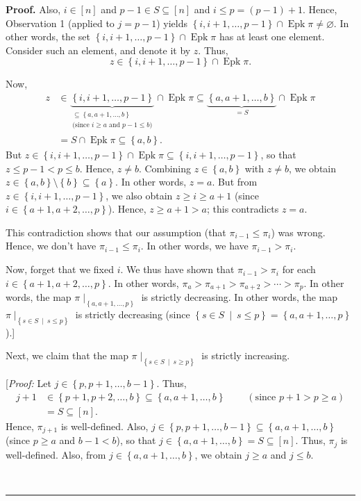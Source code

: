 \documentclass[numbers=enddot,12pt,final,onecolumn,notitlepage]{scrartcl}%
\theoremstyle{definition}
\newenvironment{proof}[1][Proof]{\noindent\textbf{#1.} }{\ \rule{0.5em}{0.5em}}
\newenvironment{verlong}{}{}
\begin{document}
\begin{verlong}
\begin{proof}
Also, $i\in\left[  n\right]  $ and $p-1\in S\subseteq\left[  n\right]  $ and
$i\leq p=\left(  p-1\right)  +1$. Hence, Observation 1 (applied to $j=p-1$)
yields $\left\{  i,i+1,\ldots,p-1\right\}  \cap\operatorname{Epk}\pi
\neq\varnothing$. In other words, the set $\left\{  i,i+1,\ldots,p-1\right\}
\cap\operatorname{Epk}\pi$ has at least one element. Consider such an
element, and denote it by $z$. Thus,%
\[
z\in\left\{  i,i+1,\ldots,p-1\right\}  \cap\operatorname{Epk}\pi.
\]


Now,%
\begin{align*}
z  &  \in\underbrace{\left\{  i,i+1,\ldots,p-1\right\}  }_{\substack{\subseteq
\left\{  a,a+1,\ldots,b\right\}  \\\text{(since }i\geq a\text{ and }p-1\leq
b\text{)}}}\cap\operatorname{Epk}\pi
\subseteq
\underbrace{\left\{  a,a+1,\ldots
,b\right\}  }_{=S}\cap\operatorname{Epk}\pi\\
&  =S\cap\operatorname{Epk}\pi
\subseteq \left\{  a,b\right\}  .
\end{align*}
But $z\in\left\{  i,i+1,\ldots,p-1\right\}  \cap\operatorname{Epk} \pi
\subseteq\left\{  i,i+1,\ldots,p-1\right\}  $, so that $z\leq p-1<p\leq b$.
Hence, $z\neq b$. Combining $z\in\left\{  a,b\right\}  $ with $z\neq b$, we
obtain $z\in\left\{  a,b\right\}  \setminus\left\{  b\right\}  \subseteq
\left\{  a\right\}  $. In other words, $z=a$. But from $z\in\left\{
i,i+1,\ldots,p-1\right\}  $, we also obtain $z\geq i\geq a+1$ (since
$i\in\left\{  a+1,a+2,\ldots,p\right\}  $). Hence, $z\geq a+1>a$; this
contradicts $z=a$.

This contradiction shows that our assumption (that $\pi_{i-1}\leq\pi_{i}$) was
wrong. Hence, we don't have $\pi_{i-1}\leq\pi_{i}$. In other words, we have
$\pi_{i-1}>\pi_{i}$.

Now, forget that we fixed $i$. We thus have shown that $\pi_{i-1}>\pi_{i}$ for
each $i\in\left\{  a+1,a+2,\ldots,p\right\}  $. In other words, $\pi_{a}%
>\pi_{a+1}>\pi_{a+2}>\cdots>\pi_{p}$. In other words, the map $\pi
\mid_{\left\{  a,a+1,\ldots,p\right\}  }$ is strictly decreasing. In other
words, the map $\pi\mid_{\left\{  s\in S\ \mid\ s\leq p\right\}  }$ is
strictly decreasing (since $\left\{  s\in S\ \mid\ s\leq p\right\}  =\left\{
a,a+1,\ldots,p\right\}  $).]

Next, we claim that the map $\pi\mid_{\left\{  s\in S\ \mid\ s\geq p\right\}
}$ is strictly increasing.

[\textit{Proof:} Let $j\in\left\{  p,p+1,\ldots,b-1\right\}  $. Thus,%
\begin{align*}
j+1  &  \in\left\{  p+1,p+2,\ldots,b\right\}  \subseteq\left\{  a,a+1,\ldots
,b\right\}  \ \ \ \ \ \ \ \ \ \ \left(  \text{since }p+1>p\geq a\right) \\
&  =S\subseteq\left[  n\right]  .
\end{align*}
Hence, $\pi_{j+1}$ is well-defined. Also, $j\in\left\{  p,p+1,\ldots
,b-1\right\}  \subseteq\left\{  a,a+1,\ldots,b\right\}  $ (since $p\geq a$ and
$b-1<b$), so that $j\in\left\{  a,a+1,\ldots,b\right\}  =S\subseteq\left[
n\right]  $. Thus, $\pi_{j}$ is well-defined. Also, from $j\in\left\{
a,a+1,\ldots,b\right\}  $, we obtain $j\geq a$ and $j\leq b$.


\end{proof}
\end{verlong}
\end{document}
